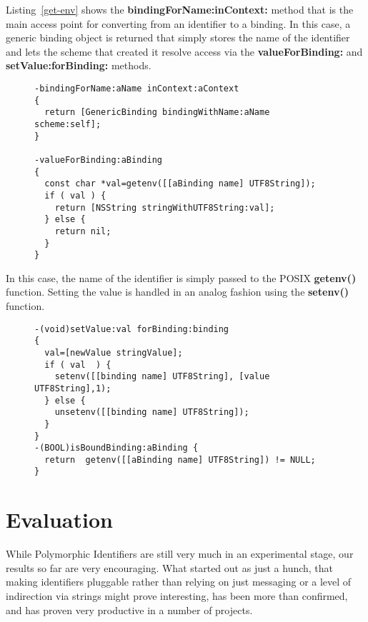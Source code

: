 \documentclass[preprint]{sigplanconf}
\begin{document}
Listing~\ref{get-env} 
shows the {\bf bindingForName:inContext:} method that is the main access point for
converting from an identifier to a binding.  In this case, a generic binding object is returned
that simply stores the name of the identifier and lets the scheme that created it resolve
access via the {\bf valueForBinding:} and {\bf setValue:forBinding:} methods.


\begin{figure}[htbp]
\begin{lstlisting}[style=numbers,label=get-env,caption=Basic lookup in env: scheme.]
-bindingForName:aName inContext:aContext
{
  return [GenericBinding bindingWithName:aName scheme:self];
}

-valueForBinding:aBinding
{
  const char *val=getenv([[aBinding name] UTF8String]);
  if ( val ) {
    return [NSString stringWithUTF8String:val];
  } else {
    return nil;
  }
}
\end{lstlisting}
\end{figure}

In this case, the name of the identifier is simply passed to the POSIX {\bf getenv()} function.
Setting the value is handled in an analog fashion using the {\bf setenv()} function.


\begin{figure}[htbp]
\begin{lstlisting}[style=numbers,label=setvalue-env,caption=Set and check value in env: scheme.]
-(void)setValue:val forBinding:binding
{
  val=[newValue stringValue];
  if ( val  ) {
    setenv([[binding name] UTF8String], [value UTF8String],1);
  } else {
    unsetenv([[binding name] UTF8String]);
  }
}
-(BOOL)isBoundBinding:aBinding {
  return  getenv([[aBinding name] UTF8String]) != NULL;
}
\end{lstlisting}
\end{figure}



\section{Evaluation}
\label{evaluation}

While Polymorphic Identifiers are still very much in an experimental stage, our
results so far are very encouraging.  What started out as just a hunch, that making
identifiers pluggable rather than relying on just messaging or a level of indirection
via strings might prove interesting, has been more than confirmed, and has proven
very productive in a number of projects.
\end{document}
